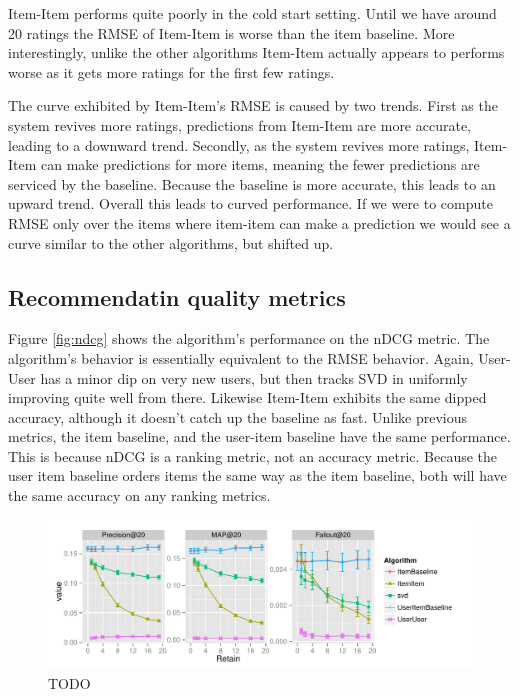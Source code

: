 \documentclass[letterpaper]{sig-alternate}
\begin{document}
  Item-Item performs quite poorly in the cold start setting.
  Until we have around 20 ratings the RMSE of Item-Item is worse than the item baseline.
  More interestingly, unlike the other algorithms Item-Item actually appears to performs worse as it gets more ratings for the first few ratings.
  
  The curve exhibited by Item-Item's RMSE is caused by two trends.
  First as the system revives more ratings, predictions from Item-Item are more accurate, leading to a downward trend.
  Secondly, as the system revives more ratings, Item-Item can make predictions for more items, meaning the fewer predictions are serviced by the baseline.
  Because the baseline is more accurate, this leads to an upward trend.
  Overall this leads to curved performance.
  If we were to compute RMSE only over the items where item-item can make a prediction we would see a curve similar to the other algorithms, but shifted up.

\subsection {Recommendatin quality metrics}
  Figure \ref{fig:ndcg} shows the algorithm's performance on the nDCG metric.
  The algorithm's behavior is essentially equivalent to the RMSE behavior.
  Again, User-User has a minor dip on very new users, but then tracks SVD in uniformly improving quite well from there.
  Likewise Item-Item exhibits the same dipped accuracy, although it doesn't catch up the baseline as fast.
  Unlike previous metrics, the item baseline, and the user-item baseline have the same performance.
  This is because nDCG is a ranking metric, not an accuracy metric.
  Because the user item baseline orders items the same way as the item baseline, both will have the same accuracy on any ranking metrics.



\begin{figure}[ht!]
  \centering
  \includegraphics[width=1.1\linewidth]{../lenskit/output/ekstrandTuned20/TopNPrecision.pdf}
  \caption{TODO}
  \label{fig:map}
\end{figure}
\end{document}
